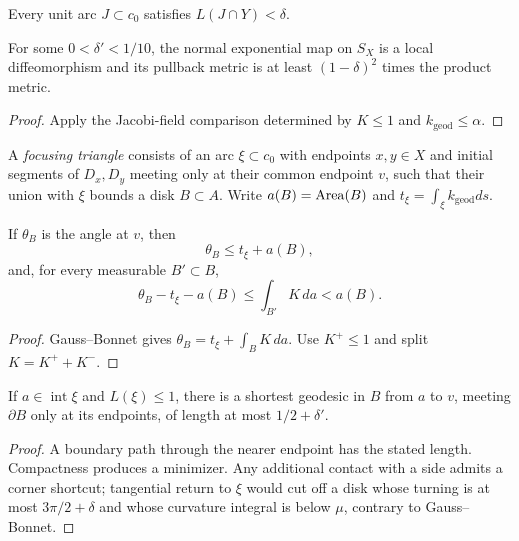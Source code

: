 \begin{remark}
\label{rem:high-curvature-set-length-bound}
\label{Ylengthrem}
Every unit arc $J\subset c_0$ satisfies $L(J\cap Y)<\delta$.
\end{remark}

\begin{claim}
\label{claim:exponential-map-local-diffeomorphism}
\label{expcomp}
For some $0<\delta'<1/10$, the normal exponential map on $S_X$ is a local
diffeomorphism and its pullback metric is at least $(1-\delta)^2$ times the
product metric.
\end{claim}
\begin{proof}
\sketch Apply the Jacobi-field comparison determined by $K\le1$ and
$k_{\mathrm{geod}}\le\alpha$.
\end{proof}

A \emph{focusing triangle} consists of an arc $\xi\subset c_0$ with endpoints
$x,y\in X$ and initial segments of $D_x,D_y$ meeting only at their common
endpoint $v$, such that their union with $\xi$ bounds a disk $B\subset A$.
Write $a(B)=\operatorname{Area}(B)$ and
$t_\xi=\int_\xi k_{\mathrm{geod}}ds$.

\begin{claim}
\label{claim:focusing-triangle-angle-curvature-bound}
\label{theta/Kbd}
If $\theta_B$ is the angle at $v$, then
\[
\theta_B\le t_\xi+a(B),
\]
and, for every measurable $B'\subset B$,
\[
\theta_B-t_\xi-a(B)\le\int_{B'}K\,da<a(B).
\]
\end{claim}
\begin{proof}
\sketch Gauss--Bonnet gives
$\theta_B=t_\xi+\int_BK\,da$. Use $K^+\le1$ and split $K=K^++K^-$.
\end{proof}

\begin{claim}
\label{claim:focusing-triangle-vertex-geodesic}
\label{avgeo}
If $a\in\operatorname{int}\xi$ and $L(\xi)\le1$, there is a shortest
geodesic in $B$ from $a$ to $v$, meeting $\partial B$ only at its endpoints,
of length at most $1/2+\delta'$.
\end{claim}
\begin{proof}
\sketch A boundary path through the nearer endpoint has the stated length.
Compactness produces a minimizer. Any additional contact with a side admits a
corner shortcut; tangential return to $\xi$ would cut off a disk whose turning
is at most $3\pi/2+\delta$ and whose curvature integral is below $\mu$, contrary
to Gauss--Bonnet.
\end{proof}

